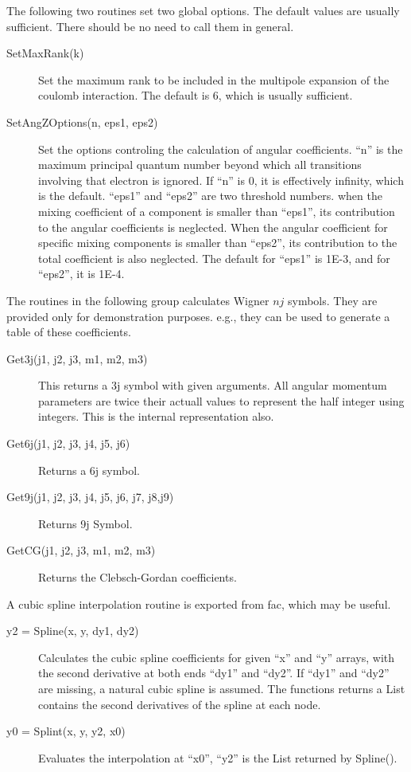 \documentclass[12pt]{article}
\begin{document}
The following two routines set two global options. The default values are
usually sufficient. There should be no need to call them in general. 
\begin{description}
\item[SetMaxRank(k)] 
Set the maximum rank to be included in the multipole
expansion of the coulomb interaction. The default is 6, which is usually
sufficient. 

\item[SetAngZOptions(n, eps1, eps2)] 
Set the options controling the
calculation of angular coefficients. ``n'' is the maximum principal quantum
number beyond which all transitions involving that electron is ignored. If
``n'' is 0, it is effectively infinity, which is the default. 
``eps1'' and ``eps2'' are two threshold numbers. when
the mixing coefficient of a component is smaller than ``eps1'', its
contribution to the angular coefficients is neglected. When the angular
coefficient for specific mixing components is smaller than ``eps2'', its
contribution to the total coefficient is also neglected. The default for
``eps1'' is 1E-3, and for ``eps2'', it is 1E-4. 

\end{description}

The routines in the following group calculates Wigner $nj$ symbols. They are
provided only for demonstration purposes. e.g., they can be used to generate a
table of these coefficients.
\begin{description}
\item[Get3j(j1, j2, j3, m1, m2, m3)] This returns a 3j symbol with given
arguments. All angular momentum parameters are twice their actuall values to
represent the half integer using integers. This is the internal
representation also. 

\item[Get6j(j1, j2, j3, j4, j5, j6)] Returns a 6j symbol.

\item[Get9j(j1, j2, j3, j4, j5, j6, j7, j8,j9)] Returns 9j Symbol.

\item[GetCG(j1, j2, j3, m1, m2, m3)] Returns the Clebsch-Gordan coefficients.

\end{description}

A cubic spline interpolation routine is exported from fac, which may be
useful. 
\begin{description}
\item[y2 = Spline(x, y, dy1, dy2)]
Calculates the cubic spline coefficients for given ``x'' and ``y'' arrays,
with the second derivative at both ends ``dy1'' and ``dy2''. If ``dy1'' and
``dy2'' are missing, a natural cubic spline is assumed. The functions returns
a List contains the second derivatives of the spline at each node.

\item[y0 = Splint(x, y, y2, x0)] 
Evaluates the interpolation at ``x0'', ``y2'' is the List returned by
Spline(). 
\end{description}
\end{document}
